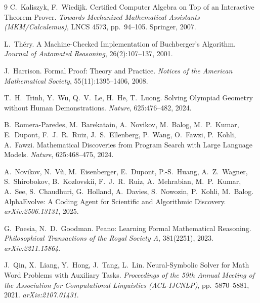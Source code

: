 \documentclass[11pt]{article}
\numberwithin{equation}{section}
\begin{document}
\begin{thebibliography}{9}
C.~Kaliszyk, F.~Wiedijk.
\newblock Certified Computer Algebra on Top of an Interactive Theorem Prover.
\newblock \emph{Towards Mechanized Mathematical Assistants (MKM/Calculemus)}, LNCS 4573, pp.~94--105. Springer, 2007.

L.~Th\'{e}ry.
\newblock A Machine-Checked Implementation of Buchberger's Algorithm.
\newblock \emph{Journal of Automated Reasoning}, 26(2):107--137, 2001.

J.~Harrison.
\newblock Formal Proof: Theory and Practice.
\newblock \emph{Notices of the American Mathematical Society}, 55(11):1395--1406, 2008.

T.~H.~Trinh, Y.~Wu, Q.~V.~Le, H.~He, T.~Luong.
\newblock Solving Olympiad Geometry without Human Demonstrations.
\newblock \emph{Nature}, 625:476--482, 2024.

B.~Romera-Paredes, M.~Barekatain, A.~Novikov, M.~Balog, M.~P.~Kumar, E.~Dupont, F.~J.~R.~Ruiz, J.~S.~Ellenberg, P.~Wang, O.~Fawzi, P.~Kohli, A.~Fawzi.
\newblock Mathematical Discoveries from Program Search with Large Language Models.
\newblock \emph{Nature}, 625:468--475, 2024.

A.~Novikov, N.~V\~{u}, M.~Eisenberger, E.~Dupont, P.-S.~Huang, A.~Z.~Wagner, S.~Shirobokov, B.~Kozlovskii, F.~J.~R.~Ruiz, A.~Mehrabian, M.~P.~Kumar, A.~See, S.~Chaudhuri, G.~Holland, A.~Davies, S.~Nowozin, P.~Kohli, M.~Balog.
\newblock AlphaEvolve: A Coding Agent for Scientific and Algorithmic Discovery.
\newblock \emph{arXiv:2506.13131}, 2025.

G.~Poesia, N.~D.~Goodman.
\newblock Peano: Learning Formal Mathematical Reasoning.
\newblock \emph{Philosophical Transactions of the Royal Society A}, 381(2251), 2023. \emph{arXiv:2211.15864}.

J.~Qin, X.~Liang, Y.~Hong, J.~Tang, L.~Lin.
\newblock Neural-Symbolic Solver for Math Word Problems with Auxiliary Tasks.
\newblock \emph{Proceedings of the 59th Annual Meeting of the Association for Computational Linguistics (ACL-IJCNLP)}, pp.~5870--5881, 2021. \emph{arXiv:2107.01431}.

\end{thebibliography}
\end{document}
